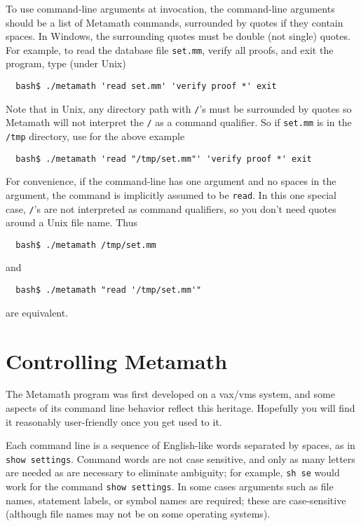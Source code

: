 To use command-line arguments at invocation, the command-line arguments
should be a list of Metamath commands, surrounded by quotes if they
contain spaces.  In Windows, the surrounding quotes must be double (not
single) quotes.  For example, to read the database file \texttt{set.mm},
verify all proofs, and exit the program, type (under Unix)
\begin{verbatim}
  bash$ ./metamath 'read set.mm' 'verify proof *' exit
\end{verbatim}
Note that in Unix, any directory path with \texttt{/}'s must be
surrounded by quotes so Metamath will not interpret the \texttt{/} as a
command qualifier.  So if \texttt{set.mm} is in the \texttt{/tmp}
directory, use for the above example
\begin{verbatim}
  bash$ ./metamath 'read "/tmp/set.mm"' 'verify proof *' exit
\end{verbatim}

For convenience, if the command-line has one argument and no spaces in
the argument, the command is implicitly assumed to be \texttt{read}.  In
this one special case, \texttt{/}'s are not interpreted as command
qualifiers, so you don't need quotes around a Unix file name.  Thus
\begin{verbatim}
  bash$ ./metamath /tmp/set.mm
\end{verbatim}
and
\begin{verbatim}
  bash$ ./metamath "read '/tmp/set.mm'"
\end{verbatim}
are equivalent.


\section{Controlling Metamath}

The Metamath program was first developed on a {\sc vax/vms} system, and
some aspects of its command line behavior reflect this heritage.
Hopefully you will find it reasonably user-friendly once you get used to
it.

Each command line is a sequence of English-like words separated by
spaces, as in \texttt{show settings}.  Command words are not case
sensitive, and only as many letters are needed as are necessary to
eliminate ambiguity; for example, \texttt{sh se} would work for the
command \texttt{show settings}.  In some cases arguments such as file
names, statement labels, or symbol names are required; these are
case-sensitive (although file names may not be on some operating
systems).

